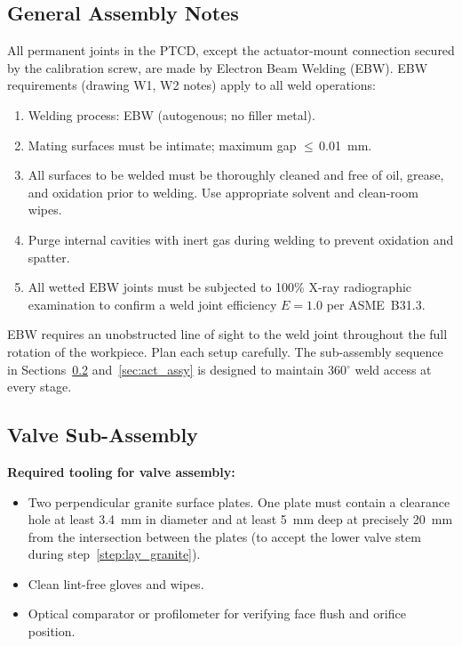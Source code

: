 \documentclass[12pt, letterpaper]{report}%
\newcounter{mycounter}           %
\newcounter{sub}[mycounter]      %
\begin{document}
\begin{appendices}
	\subsection{General Assembly Notes}

	All permanent joints in the PTCD, except the actuator-mount connection
	secured by the calibration screw,
	are made by Electron Beam Welding (EBW).
	EBW requirements (drawing W1, W2 notes) apply to all weld operations:

	\begin{enumerate}[itemsep=3pt]
		\item Welding process: EBW (autogenous; no filler metal).
		\item Mating surfaces must be intimate; maximum gap $\leq$\,\SI{0.01}{\milli\meter}.
		\item All surfaces to be welded must be thoroughly cleaned and free of oil, grease,
					and oxidation prior to welding. Use appropriate solvent and clean-room wipes.
		\item Purge internal cavities with inert gas during welding to
					prevent oxidation and spatter.
		\item All wetted EBW joints must be subjected to 100\% X-ray radiographic
					examination to confirm a weld joint efficiency $E = 1.0$ per
					ASME~B31.3\cite{ref_asme_b313}.
	\end{enumerate}

	EBW requires an unobstructed line of sight to the weld joint throughout the
	full rotation of the workpiece. Plan each setup carefully. The sub-assembly
	sequence in Sections~\ref{sec:valve_assy} and~\ref{sec:act_assy} is designed
	to maintain 360$^{\circ}$ weld access at every stage.

	\subsection{Valve Sub-Assembly}
	\label{sec:valve_assy}

	\begin{notebox}
	\textbf{Required tooling for valve assembly:}
	\begin{itemize}[itemsep=2pt]
		\item Two perpendicular granite surface plates. One plate must contain a clearance
					hole at least \SI{3.4}{\milli\meter} in diameter and at least \SI{5}{\milli\meter}
					deep at precisely \SI{20}{\milli\meter} from the intersection between the plates
					(to accept the lower valve stem during
					step~\ref{step:lay_granite}).
		\item Clean lint-free gloves and wipes.
		\item Optical comparator or profilometer for verifying face flush and orifice position.
	\end{itemize}
	\end{notebox}


\end{appendices}
\end{document}
